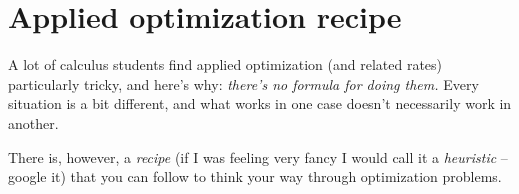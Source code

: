 
\usetikzlibrary{shapes.geometric}


%


\allowdisplaybreaks
\section{Applied optimization recipe}
A lot of calculus students find applied optimization (and related rates) particularly tricky, and here's why: \textit{there's no formula for doing them.} Every situation is a bit different, and what works in one case doesn't necessarily work in another.

There is, however, a \textit{recipe} (if I was feeling very fancy I would call it a \textit{heuristic} -- google it) that you can follow to think your way through optimization problems.

